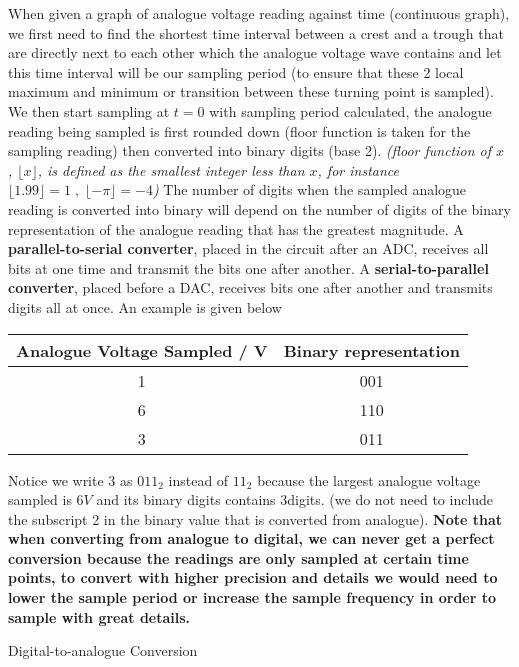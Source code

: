 \documentclass{article}
\begin{document}
When given a graph of analogue voltage reading against time (continuous graph), we first need to find the shortest time interval between a crest and a trough that are directly next to each other which the analogue voltage wave contains and let this time interval will be our sampling period (to ensure that these 2 local maximum and minimum or transition between these turning point is sampled). We then start sampling at $t=0$ with sampling period calculated, the analogue reading being sampled is first rounded down (floor function is taken for the sampling reading) then converted into binary digits (base 2).\textit{ (floor function of $x$ , $\lfloor x \rfloor$, is defined as the smallest integer less than $x$, for instance $\lfloor 1.99 \rfloor =1 \; ,\; \lfloor -\pi\rfloor = -4$)} The number of digits when the sampled analogue reading is converted into binary will depend on the number of digits of the binary representation of the analogue reading that has the greatest magnitude. A \textbf{parallel-to-serial converter}, placed in the circuit after an ADC, receives all bits at one time and transmit the bits one after another. A \textbf{serial-to-parallel converter}, placed before a DAC, receives bits one after another and transmits digits all at once. An example is given below
\begin{center}
    \begin{tabular}{|c|c|}
    \hline
    Analogue Voltage Sampled \; / V      & Binary representation  \\
    \hline
    1     & 001 \\
    \hline
       6  & 110\\
    \hline
      3   & 011\\
      \hline
    \end{tabular}
\end{center}
Notice we write $3$ as $011_2$ instead of $11_2$ because the largest analogue voltage sampled is $6V$ and its binary digits contains $3$digits. (we do not need to include the subscript 2 in the binary value that is converted from analogue). \textbf{Note that when converting from analogue to digital, we can never get a perfect conversion because the readings are only sampled at certain time points, to convert with higher precision and details we would need to lower the sample period or increase the sample frequency in order to sample with great details.}

\begin{flushleft}
\item Digital-to-analogue Conversion
\end{flushleft}
 
\end{document}
